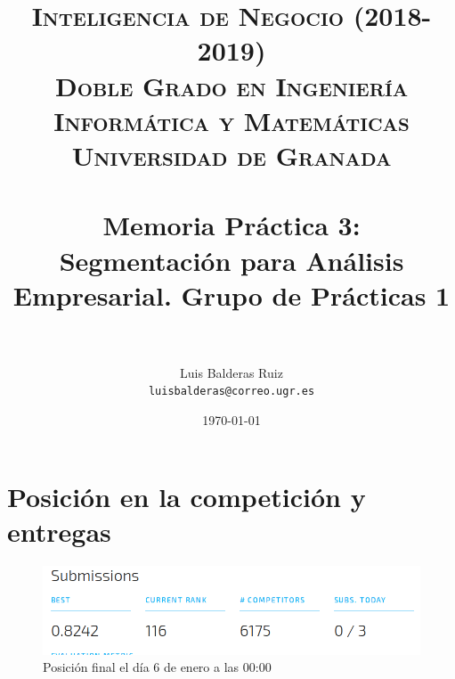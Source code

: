 
\usepackage{graphicx}
\graphicspath{ {./imgs/} }


\title{	
	\normalfont \normalsize 
	\textsc{\textbf{Inteligencia de Negocio (2018-2019)} \\ Doble Grado en Ingeniería Informática y Matemáticas \\ Universidad de Granada} \\ [25pt] %
	\horrule{0.5pt} \\[0.4cm] %
	\huge Memoria Práctica 3: \\ Segmentación para Análisis Empresarial. Grupo de Prácticas 1 \\ %
	\horrule{2pt} \\[0.5cm] %
}

\author{Luis Balderas Ruiz \\ \texttt{luisbalderas@correo.ugr.es}} 

\date{\normalsize\today} %



	
\maketitle %
	
\newpage %

\section{Posición en la competición y entregas}	

\begin{figure}[H] %
	\centering
	\includegraphics[scale=0.5]{rank.png}  %
	\caption{Posición final el día 6 de enero a las 00:00} 
	\label{fig:rank}
\end{figure}
	

